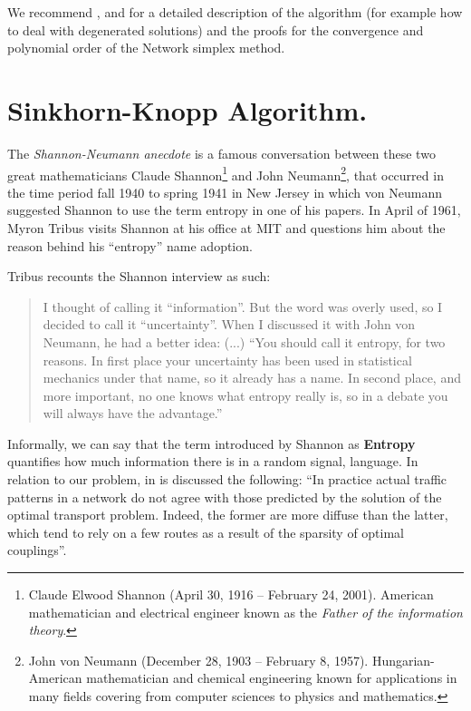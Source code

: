 We recommend \cite{Cuturi2018CompOT}, \cite{Orlin1997PolynomialTimeNetworkSimplex} and \cite{Tarjan1997DynamicTreesNetworkSimplex} for a detailed description of the algorithm (for example how to deal with degenerated solutions) and the proofs for the convergence and polynomial order of the Network simplex method.


\section{Sinkhorn-Knopp Algorithm.}
The \emph{Shannon-Neumann anecdote} is a famous conversation between these two great mathematicians Claude Shannon\footnote{Claude Elwood Shannon (April 30, 1916 – February 24, 2001). American mathematician and electrical engineer known as the \textit{Father of the information theory}.} and  John Neumann\footnote{John von Neumann (December 28, 1903 – February 8, 1957). Hungarian-American mathematician and chemical engineering known for applications in many fields covering from computer sciences to physics and mathematics.}, that occurred in the time period fall 1940 to spring 1941 in New Jersey in which von Neumann suggested Shannon to use the term entropy in one of his papers. In April of 1961, Myron Tribus visits Shannon at his office at MIT and questions him about the reason behind his ``entropy'' name adoption.	

Tribus recounts the Shannon interview \cite{Tribus1964Shannon} as such:
\begin{quote}
	I thought of calling it ``information''. But the word was overly used,
	so I decided to call it ``uncertainty''. When I discussed it with John von Neumann, he had a better idea: (...) ``You should call it entropy, for two reasons. In first place your uncertainty has been used in statistical mechanics under that name, so it already has a name. In second place, and more important, no one knows what entropy really is, so in a debate you will always have the advantage.''
\end{quote}


Informally, we can say that the term introduced by Shannon as \textbf{Entropy} quantifies how much information there is in a random signal, language. In relation to our problem, in \cite{Cuturi2018CompOT} is discussed the following: ``In practice actual traffic patterns in a network do not agree with those predicted by the solution of the optimal transport problem. Indeed, the former are more diffuse than the latter, which tend to rely on a few routes as a result of the sparsity of optimal couplings''. \\

